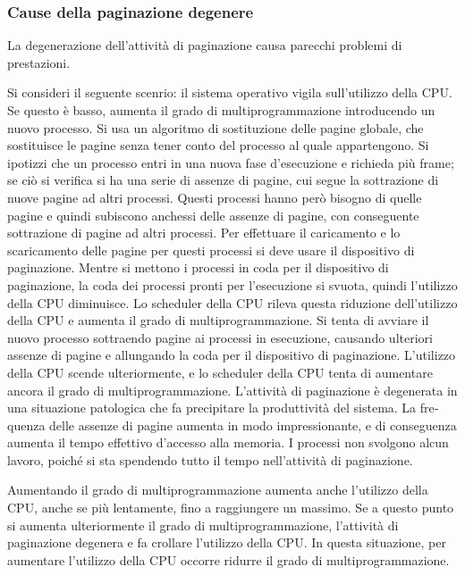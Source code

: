 \documentclass[11pt,a4paper]{article}
\begin{document}
{\subsubsection{Cause della paginazione degenere}
La degenerazione dell'attività di paginazione causa parecchi problemi di prestazioni.

Si consideri il seguente scenrio: il sistema operativo vigila sull'utilizzo della CPU. Se questo è basso, aumenta il grado di
multiprogrammazione introducendo un nuovo processo. Si usa un algoritmo di sostituzione delle pagine globale, che sostituisce le pagine senza tener conto del processo al quale apparten­gono. Si ipotizzi che un processo entri in una nuova fase d'esecuzione e richieda più fra­me; se ciò si verifica si ha una serie di assenze di pagine, cui segue la sottrazione di nuove pagi­ne ad altri processi. Questi processi hanno però bisogno di quelle pagine e quindi subiscono
anchessi delle assenze di pagine, con conseguente sottrazione di pagine ad altri processi. Per ef­fettuare il caricamento e lo scaricamento delle pagine per questi processi si deve usare il dispo­sitivo di paginazione. Mentre si mettono i processi in coda per il dispositivo di paginazione, la
coda dei processi pronti per l'esecuzione si svuota, quindi l'utilizzo della CPU diminuisce.
Lo scheduler della CPU rileva questa riduzione dell'utilizzo della CPU e aumenta il gra­do di multiprogrammazione. Si tenta di avviare il nuovo processo sottraendo pagine ai pro­cessi in esecuzione, causando ulteriori assenze di pagine e allungando la coda per il disposi­tivo di paginazione. L'utilizzo della CPU scende ulteriormente, e lo scheduler della CPU ten­ta di aumentare ancora il grado di multiprogrammazione. L'attività di paginazione è
degenerata in una situazione patologica che fa precipitare la produttività del sistema. La fre­quenza delle assenze di pagine aumenta in modo impressionante, e di conseguenza aumen­ta il tempo effettivo d'accesso alla memoria. I processi non svolgono alcun lavoro, poiché si
sta spendendo tutto il tempo nell'attività di paginazione.

Aumentando il grado di multiprogrammazio­ne aumenta anche l'utilizzo della CPU, anche se più lentamente, fino a raggiungere un mas­simo. Se a questo punto si aumenta ulteriormente il grado di multiprogrammazione, l'atti­vità di paginazione degenera e fa crollare l'utilizzo della CPU. In questa situazione, per au­mentare l'utilizzo della CPU occorre ridurre il grado di multiprogrammazione.

}
\end{document}
